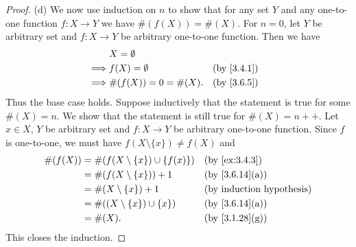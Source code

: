 \begin{proof}{(d)}
  We now use induction on \(n\) to show that for any set \(Y\) and any one-to-one function \(f : X \to Y\) we have \(\#(f(X)) = \#(X)\).
  For \(n = 0\), let \(Y\) be arbitrary set and \(f : X \to Y\) be arbitrary one-to-one function.
  Then we have
  \begin{align*}
             & X = \emptyset                         \\
    \implies & f(X) = \emptyset      &  & \by{3.4.1} \\
    \implies & \#(f(X)) = 0 = \#(X). &  & \by{3.6.5}
  \end{align*}
  Thus the base case holds.
  Suppose inductively that the statement is true for some \(\#(X) = n\).
  We show that the statement is still true for \(\#(X) = n++\).
  Let \(x \in X\), \(Y\) be arbitrary set and \(f : X \to Y\) be arbitrary one-to-one function.
  Since \(f\) is one-to-one, we must have \(f(X \setminus \{x\}) \neq f(X)\) and
  \begin{align*}
    \#(f(X)) & = \#(f(X \setminus \{x\}) \cup \{f(x)\}) &  & \by{ex:3.4.3}                \\
             & = \#(f(X \setminus \{x\})) + 1           &  & \text{(by \cref{3.6.14}(a))} \\
             & = \#(X \setminus \{x\}) + 1              &  & \byIH                        \\
             & = \#((X \setminus \{x\}) \cup \{x\})     &  & \text{(by \cref{3.6.14}(a))} \\
             & = \#(X).                                 &  & \text{(by \cref{3.1.28}(g))}
  \end{align*}
  This closes the induction.
\end{proof}

